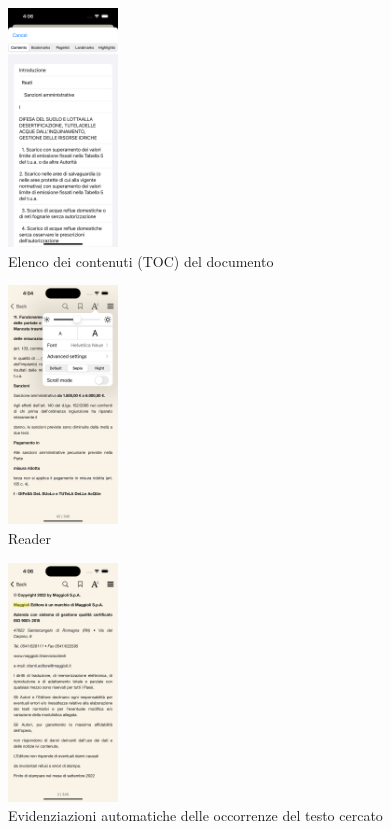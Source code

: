 \begin{multicols}{3}
    \begin{figure}[H]
        \centering
        \includegraphics[width=0.26\textwidth]{img/toc_ios.png}
        \caption{Elenco dei contenuti (TOC) del documento}
        \label{toc-ios}
    \end{figure}

    \begin{figure}[H]
        \centering
        \includegraphics[width=0.26\textwidth]{img/reader_settings_ios.png}
        \caption{Reader}
        \label{readersettings-ios}
    \end{figure}
    
    \begin{figure}[H]
        \centering
        \includegraphics[width=0.26\textwidth]{img/ricerca_testo2_ios.png}
        \caption{Evidenziazioni automatiche delle occorrenze del testo cercato}
        \label{ricerca_testo2-ios}
    \end{figure}
\end{multicols}
